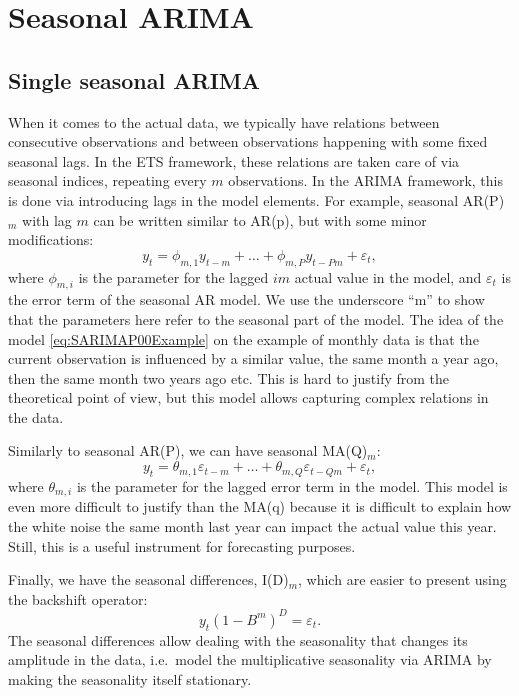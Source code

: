 \documentclass[
]{book}
\theoremstyle{definition}
\theoremstyle{definition}
\theoremstyle{definition}
\theoremstyle{definition}
\theoremstyle{remark}
\begin{document}
\hypertarget{seasonal-arima}{%
\section{Seasonal ARIMA}\label{seasonal-arima}}

\hypertarget{single-seasonal-arima}{%
\subsection{Single seasonal ARIMA}\label{single-seasonal-arima}}

When it comes to the actual data, we typically have relations between consecutive observations and between observations happening with some fixed seasonal lags. In the ETS framework, these relations are taken care of via seasonal indices, repeating every \(m\) observations. In the ARIMA framework, this is done via introducing lags in the model elements. For example, seasonal AR(P)\(_m\) with lag \(m\) can be written similar to AR(p), but with some minor modifications:
\begin{equation}
  {y}_{t} = \phi_{m,1} y_{t-m} + \dots + \phi_{m,P} y_{t-Pm} + \varepsilon_t ,
  \label{eq:SARIMAP00Example}
\end{equation}
where \(\phi_{m,i}\) is the parameter for the lagged \(im\) actual value in the model, and \(\varepsilon_t\) is the error term of the seasonal AR model. We use the underscore ``m'' to show that the parameters here refer to the seasonal part of the model. The idea of the model \eqref{eq:SARIMAP00Example} on the example of monthly data is that the current observation is influenced by a similar value, the same month a year ago, then the same month two years ago etc. This is hard to justify from the theoretical point of view, but this model allows capturing complex relations in the data.

Similarly to seasonal AR(P), we can have seasonal MA(Q)\(_m\):
\begin{equation}
    {y}_{t} = \theta_{m,1} \varepsilon_{t-m} + \dots + \theta_{m,Q} \varepsilon_{t-Qm} + \varepsilon_t ,
  \label{eq:SARIMA00QExample}
\end{equation}
where \(\theta_{m,i}\) is the parameter for the lagged error term in the model. This model is even more difficult to justify than the MA(q) because it is difficult to explain how the white noise the same month last year can impact the actual value this year. Still, this is a useful instrument for forecasting purposes.

Finally, we have the seasonal differences, I(D)\(_m\), which are easier to present using the backshift operator:
\begin{equation}
  y_t (1-B^m)^D = \varepsilon_t.
  \label{eq:SARIMA0D0Example}
\end{equation}
The seasonal differences allow dealing with the seasonality that changes its amplitude in the data, i.e.~model the multiplicative seasonality via ARIMA by making the seasonality itself stationary.
\end{document}
